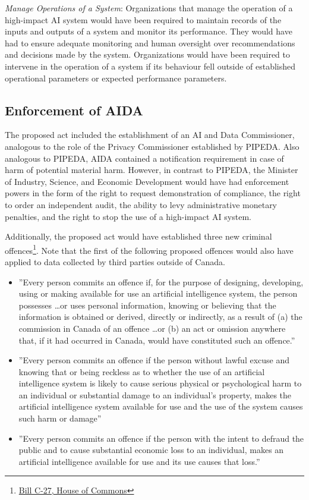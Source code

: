 \begin{advanced}
\emph{Manage Operations of a System}: Organizations that manage the operation of a high-impact AI system would have been required to maintain records of the inputs and outputs of a system and monitor its performance. They would have had to ensure adequate monitoring and human oversight over recommendations and decisions made by the system. Organizations would have been required to intervene in the operation of a system if its behaviour fell outside of established operational parameters or expected performance parameters. 

\subsection*{Enforcement of AIDA}

The proposed act included the establishment of an AI and Data Commissioner, analogous to the role of the Privacy Commissioner established by PIPEDA. Also analogous to PIPEDA, AIDA contained a notification requirement in case of harm of potential material harm. However, in contrast to PIPEDA, the Minister of Industry, Science, and Economic Development would have had enforcement powers in the form of the right to request demonstration of compliance, the right to order an independent audit, the ability to levy administrative monetary penalties, and the right to stop the use of a high-impact AI system. 

Additionally, the proposed act would have established three new criminal offences\footnote{\href{https://www.parl.ca/DocumentViewer/en/44-1/bill/C-27/first-reading}{Bill C-27, House of Commons}}. Note that the first of the following proposed offences would also have applied to data collected by third parties outside of Canada.
\begin{itemize}
  \item ''Every person commits an offence if, for the purpose of designing, developing, using or making available for use an artificial intelligence system, the person possesses \ldots or uses personal information, knowing or believing that the information is obtained or derived, directly or indirectly, as a result of (a) the commission in Canada of an offence \ldots or (b) an act or omission anywhere that, if it had occurred in Canada, would have constituted such an offence.''
  \item ''Every person commits an offence if the person without lawful excuse and knowing that or being reckless as to whether the use of an artificial intelligence system is likely to cause serious physical or psychological harm to an individual or substantial damage to an individual's property, makes the artificial intelligence system available for use and the use of the system causes such harm or damage''
  \item ''Every person commits an offence if the person with the intent to defraud the public and to cause substantial economic loss to an individual, makes an artificial intelligence available for use and its use causes that loss.''
\end{itemize}


\end{advanced}
